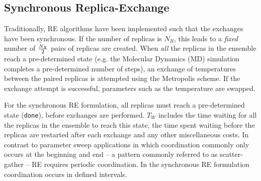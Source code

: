 \documentclass{rspublic}
\newcommand{\alnote}[1]{ {\textcolor{blue} { ***andre: #1 }}}
\newcommand{\athotanote}[1]{ {\textcolor{green} { ***athota: #1 }}}
\newcommand{\alnote}[1]{}
\newcommand{\athotanote}[1]{}
\begin{document}





\subsection{Synchronous Replica-Exchange}

Traditionally, RE algorithms have been implemented such that the
exchanges have been synchronous.  If the number of replicas is
${N_R}$, this leads to a {\it fixed} number of ${N_R \over 2}$ pairs
of replicas are created.  When \emph{all} the replicas in the ensemble
reach a pre-determined state (e.g. the Molecular Dynamics (MD)
simulation completes a pre-determined number of steps), an exchange of
temperatures between the paired replicas is attempted using the
Metropolis scheme.  If the exchange attempt is successful, parameters
such as the temperature are swapped.


For the synchronous RE formulation, all replicas must reach a
pre-determined state (\texttt{done}), before exchanges are performed.
$T_W$ includes the time waiting for all the replicas in the ensemble
to reach this state, the time spent waiting before the replicas are
restarted after each exchange and any other miscellaneous costs.  In
contrast to parameter sweep applications in which coordination
commonly only occurs at the beginning and end -- a pattern commonly
referred to as scatter-gather -- RE requires periodic coordination. In
the synchronous RE formulation coordination occurs in defined
intervals.
\end{document}
